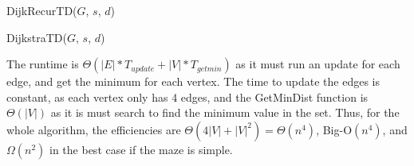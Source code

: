 \documentclass[11pt]{article}
\begin{document}
\begin{multicols}{2}
	\begin{algorithm}[H]
		\SetAlgoLined
		\SetStartEndCondition{ }{}{}%
		\AlgoDontDisplayBlockMarkers\SetAlgoNoEnd\SetAlgoNoLine%
		\caption{DijkRecurTD(${G}$, ${s}$, ${d}$)\label{tdrc}}
	\end{algorithm}

	\begin{algorithm}[H]
		\SetAlgoLined
		\SetStartEndCondition{ }{}{}%
		\AlgoDontDisplayBlockMarkers\SetAlgoNoEnd\SetAlgoNoLine%
		\caption{DijkstraTD(${G}$, ${s}$, ${d}$)\label{td}}
	\end{algorithm}

	The runtime is ${\Theta(|E|*T_{update} + |V|*T_{getmin})}$ as it must run an update for each
	edge, and get the minimum for each vertex. The time to update the edges is constant, as each
	vertex only has 4 edges, and the GetMinDist function is ${\Theta(|V|)}$ as it is must search to find the minimum value
	in the set. Thus, for the whole algorithm, the efficiencies are
	${\Theta(4|V| + |V|^2)}=\Theta(n^4)$, Big-O${(n^4)}$, and
	${\Omega(n^2)}$ in the best case if the maze is simple.


\end{multicols}
\end{document}
